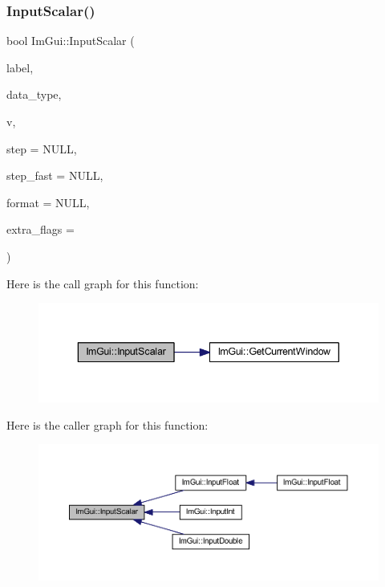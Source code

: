 \subsubsection{\texorpdfstring{Input\+Scalar()}{InputScalar()}}
{\footnotesize\ttfamily bool Im\+Gui\+::\+Input\+Scalar (\begin{DoxyParamCaption}\item[{const char $\ast$}]{label,  }\item[{\mbox{\hyperlink{imgui_8h_a4cfa8697a3d76722fff83eb18922e9d5}{Im\+Gui\+Data\+Type}}}]{data\+\_\+type,  }\item[{void $\ast$}]{v,  }\item[{const void $\ast$}]{step = {\ttfamily NULL},  }\item[{const void $\ast$}]{step\+\_\+fast = {\ttfamily NULL},  }\item[{const char $\ast$}]{format = {\ttfamily NULL},  }\item[{\mbox{\hyperlink{imgui_8h_a7d2c6153a6b9b5d3178ce82434ac9fb8}{Im\+Gui\+Input\+Text\+Flags}}}]{extra\+\_\+flags = {} }\end{DoxyParamCaption})}

Here is the call graph for this function\+:
\nopagebreak
\begin{figure}[H]
\begin{center}
\leavevmode
\includegraphics[width=343pt]{namespace_im_gui_a9d6eada4e703c3bf4b2b5e5533a127fd_cgraph}
\end{center}
\end{figure}
Here is the caller graph for this function\+:
\nopagebreak
\begin{figure}[H]
\begin{center}
\leavevmode
\includegraphics[width=350pt]{namespace_im_gui_a9d6eada4e703c3bf4b2b5e5533a127fd_icgraph}
\end{center}
\end{figure}
\mbox{\label{namespace_im_gui_ad724ab94c8aff2440c6a1b58ae7b2334}} 
